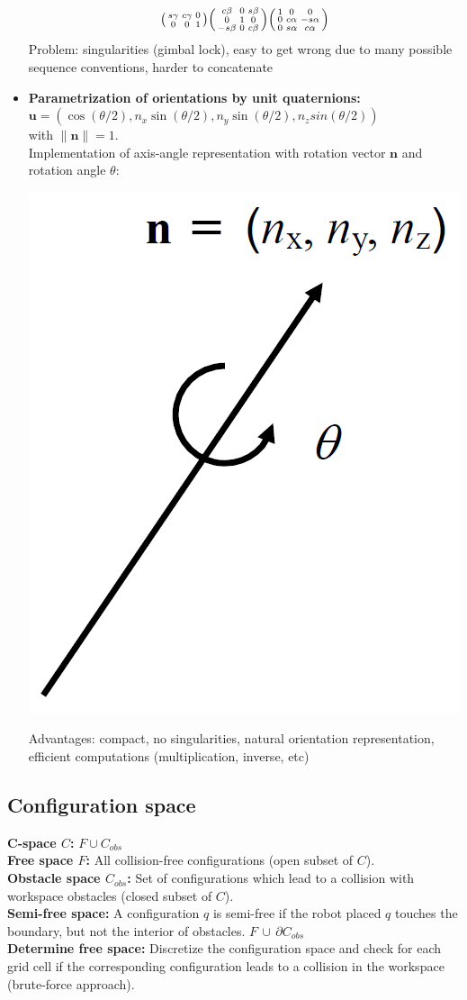 \begin{multicols*}{2}
\begin{itemize}
\begin{align*}
\begin{psmallmatrix}
			s\gamma & c\gamma & 0\\
			0 & 0 & 1
		\end{psmallmatrix}
		\begin{psmallmatrix}
			c\beta & 0 & s\beta\\
			0 & 1 & 0\\
			-s\beta & 0 & c\beta
		\end{psmallmatrix}
		\begin{psmallmatrix}
			1 & 0 & 0\\
			0 & c\alpha & -s\alpha\\
			0 & s\alpha & c\alpha
		\end{psmallmatrix}
	\end{align*}
	Problem: singularities (gimbal lock), easy to get wrong due to many possible sequence conventions, harder to concatenate
	\item \textbf{Parametrization of orientations by unit quaternions:}\\
	$\mathbold{u} = (\cos(\theta/2), n_x \sin(\theta/2), n_y \sin(\theta/2), n_z sin(\theta/2))$\\
	with $\lVert \mathbold{n} \rVert = 1$.\\
	Implementation of axis-angle representation with rotation vector $\mathbold{n}$ and rotation angle $\theta$:
	\begin{center}
		\includegraphics[width=0.3\columnwidth]{images/axis-angle-representation.png}
	\end{center}
	Advantages: compact, no singularities, natural orientation representation, efficient computations (multiplication, inverse, etc)
\end{itemize}

\subsection{Configuration space}
\textbf{C-space $C$:} $F \cup C_{obs}$\\
\textbf{Free space $F$:} All collision-free configurations (open subset of $C$).\\
\textbf{Obstacle space $C_{obs}$:} Set of configurations which lead to a collision with workspace obstacles (closed subset of $C$).\\
\textbf{Semi-free space:} A configuration $q$ is semi-free if the robot placed $q$ touches the boundary, but not the interior of obstacles. $F \, \cup \, \partial C_{obs}$\\
\textbf{Determine free space:} Discretize the configuration space and check for each grid cell if the corresponding configuration leads to a collision in the workspace (brute-force approach).


\end{multicols*}
